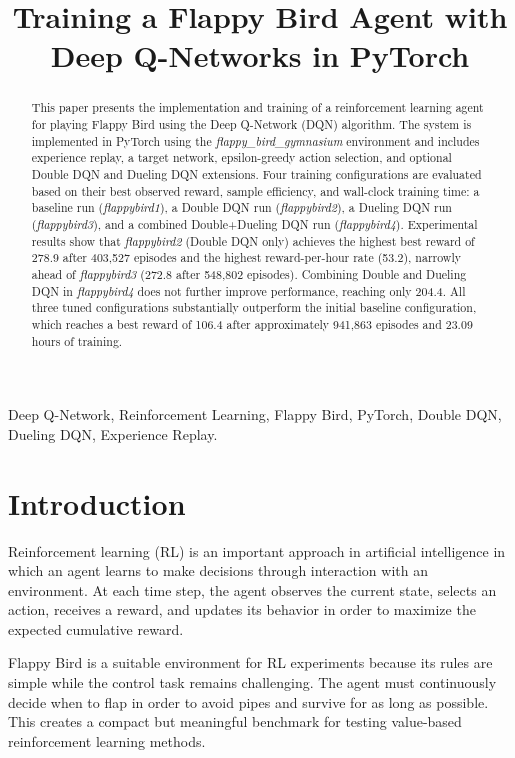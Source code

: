 \documentclass[conference]{IEEEtran}
\title{Training a Flappy Bird Agent with Deep Q-Networks in PyTorch}
\author{%
    \IEEEauthorblockN{Tran Van Thuan}
    \IEEEauthorblockA{\textit{FPT University}\\\textit{tranvanthuanppr@gmail.com}}
    \and
    \IEEEauthorblockN{Nguyen Vo Hoang Khang}
    \IEEEauthorblockA{ \textit{FPT University}\\ \textit{khangnvhse184634@fpt.edu.vn}}
}
\begin{document}
\maketitle

\begin{abstract}
This paper presents the implementation and training of a reinforcement learning agent for playing Flappy Bird using the Deep Q-Network (DQN) algorithm. The system is implemented in PyTorch using the \textit{flappy\_bird\_gymnasium} environment and includes experience replay, a target network, epsilon-greedy action selection, and optional Double DQN and Dueling DQN extensions. Four training configurations are evaluated based on their best observed reward, sample efficiency, and wall-clock training time: a baseline run (\textit{flappybird1}), a Double DQN run (\textit{flappybird2}), a Dueling DQN run (\textit{flappybird3}), and a combined Double+Dueling DQN run (\textit{flappybird4}). Experimental results show that \textit{flappybird2} (Double DQN only) achieves the highest best reward of 278.9 after 403,527 episodes and the highest reward-per-hour rate (53.2), narrowly ahead of \textit{flappybird3} (272.8 after 548,802 episodes). Combining Double and Dueling DQN in \textit{flappybird4} does not further improve performance, reaching only 204.4. All three tuned configurations substantially outperform the initial baseline configuration, which reaches a best reward of 106.4 after approximately 941,863 episodes and 23.09 hours of training.
\end{abstract}

\begin{IEEEkeywords}
Deep Q-Network, Reinforcement Learning, Flappy Bird, PyTorch, Double DQN, Dueling DQN, Experience Replay.
\end{IEEEkeywords}

\section{Introduction}
Reinforcement learning (RL) is an important approach in artificial intelligence in which an agent learns to make decisions through interaction with an environment. At each time step, the agent observes the current state, selects an action, receives a reward, and updates its behavior in order to maximize the expected cumulative reward.

Flappy Bird is a suitable environment for RL experiments because its rules are simple while the control task remains challenging. The agent must continuously decide when to flap in order to avoid pipes and survive for as long as possible. This creates a compact but meaningful benchmark for testing value-based reinforcement learning methods.
\end{document}
